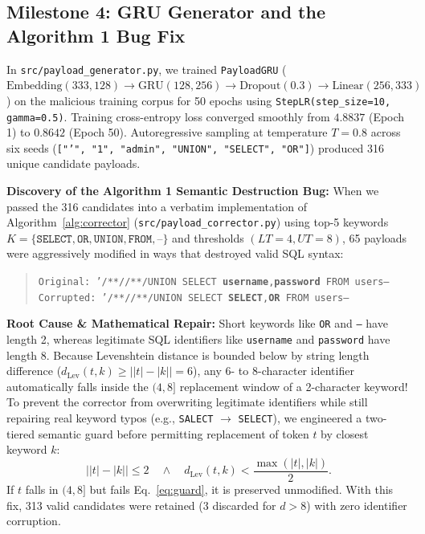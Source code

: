 \documentclass[conference]{IEEEtran}
\begin{document}
\subsection{Milestone 4: GRU Generator and the Algorithm 1 Bug Fix}
In \texttt{src/payload\_generator.py}, we trained \texttt{PayloadGRU} ($\text{Embedding}(333, 128) \to \text{GRU}(128, 256) \to \text{Dropout}(0.3) \to \text{Linear}(256, 333)$) on the malicious training corpus for 50 epochs using \texttt{StepLR(step\_size=10, gamma=0.5)}. Training cross-entropy loss converged smoothly from $4.8837$ (Epoch 1) to $0.8642$ (Epoch 50). Autoregressive sampling at temperature $T=0.8$ across six seeds (\texttt{["'", "1", "admin", "UNION", "SELECT", "OR"]}) produced 316 unique candidate payloads.

\textbf{Discovery of the Algorithm 1 Semantic Destruction Bug:} When we passed the 316 candidates into a verbatim implementation of Algorithm~\ref{alg:corrector} (\texttt{src/payload\_corrector.py}) using top-5 keywords $K = \{\texttt{SELECT}, \texttt{OR}, \texttt{UNION}, \texttt{FROM}, \texttt{--}\}$ and thresholds $(LT=4, UT=8)$, 65 payloads were aggressively modified in ways that destroyed valid SQL syntax:
\begin{quote}
\scriptsize
\texttt{Original:  '/**//**/UNION SELECT \textbf{username},\textbf{password} FROM users--}\\
\texttt{Corrupted: '/**//**/UNION SELECT \textbf{SELECT},\textbf{OR} FROM users--}
\end{quote}
\textbf{Root Cause \& Mathematical Repair:} Short keywords like \texttt{OR} and \texttt{--} have length 2, whereas legitimate SQL identifiers like \texttt{username} and \texttt{password} have length 8. Because Levenshtein distance is bounded below by string length difference ($d_{\mathrm{Lev}}(t,k) \ge |\lvert t\rvert - \lvert k\rvert| = 6$), any 6- to 8-character identifier automatically falls inside the $(4,8]$ replacement window of a 2-character keyword! To prevent the corrector from overwriting legitimate identifiers while still repairing real keyword typos (e.g., \texttt{SALECT} $\to$ \texttt{SELECT}), we engineered a two-tiered semantic guard before permitting replacement of token $t$ by closest keyword $k$:
\begin{equation}
|\lvert t\rvert-\lvert k\rvert|\le 2
\quad\land\quad
d_{\mathrm{Lev}}(t,k)<\frac{\max(\lvert t\rvert,\lvert k\rvert)}{2}.
\label{eq:guard}
\end{equation}
If $t$ falls in $(4,8]$ but fails Eq.~\eqref{eq:guard}, it is preserved unmodified. With this fix, 313 valid candidates were retained (3 discarded for $d > 8$) with zero identifier corruption.
\end{document}
